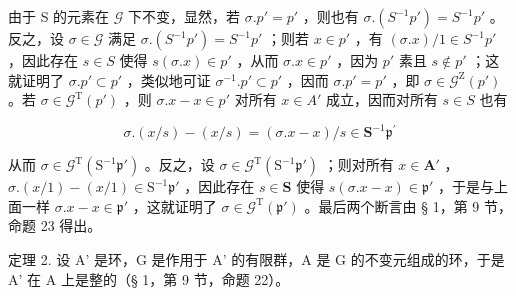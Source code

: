 由于 S 的元素在 \(\mathcal{G}\) 下不变，显然，若 \(\sigma. p' = p'\) ，则也有 \(\sigma. (S^{-1}p') = S^{-1}p'\) 。反之，设 \(\sigma \in \mathcal{G}\) 满足 \(\sigma. (S^{-1}p') = S^{-1}p'\) ；则若 \(x \in p'\) ，有 \((\sigma.x)/1 \in S^{-1}p'\) ，因此存在 \(s \in S\) 使得 \(s(\sigma.x) \in p'\) ，从而 \(\sigma.x \in p'\) ，因为 \(p'\) 素且 \(s \notin p'\) ；这就证明了 \(\sigma. p' \subset p'\) ，类似地可证 \(\sigma^{-1}. p' \subset p'\) ，因而 \(\sigma. p' = p'\) ，即 \(\sigma \in \mathcal{G}^{\mathrm{Z}}(p')\) 。若 \(\sigma \in \mathcal{G}^{\mathrm{T}}(p')\) ，则 \(\sigma.x - x \in p'\) 对所有 \(x \in A'\) 成立，因而对所有 \(s \in S\) 也有

\[
\sigma . (x / s) - (x / s) = (\sigma . x - x) / s \in \mathbf {S} ^ {- 1} \mathfrak {p} ^ {\prime}
\]

从而 \(\sigma \in \mathcal{G}^{\mathrm{T}}(\mathrm{S}^{-1}\mathfrak{p}')\) 。反之，设 \(\sigma \in \mathcal{G}^{\mathrm{T}}(\mathrm{S}^{-1}\mathfrak{p}')\) ；则对所有 \(x \in \mathbf{A}'\) ，\(\sigma.(x/1) - (x/1) \in \mathrm{S}^{-1}\mathfrak{p}'\) ，因此存在 \(s \in \mathbf{S}\) 使得 \(s(\sigma.x - x) \in \mathfrak{p}'\) ，于是与上面一样 \(\sigma.x - x \in \mathfrak{p}'\) ，这就证明了 \(\sigma \in \mathcal{G}^{\mathrm{T}}(\mathfrak{p}')\) 。最后两个断言由 § 1，第 9 节，命题 23 得出。

定理 2. 设 A' 是环，G 是作用于 A' 的有限群，A 是 G 的不变元组成的环，于是 A' 在 A 上是整的（§ 1，第 9 节，命题 22）。


